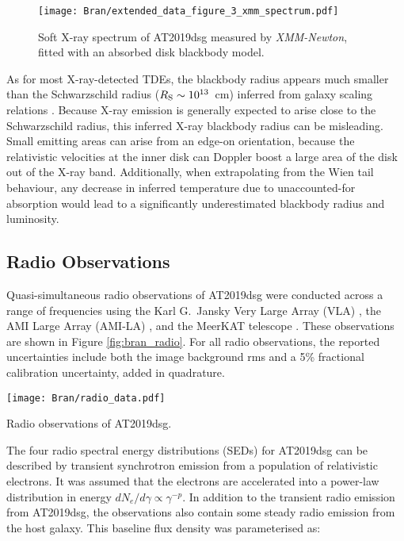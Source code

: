 \begin{figure}[!ht]
	\texttt{[image: Bran/extended\_data\_figure\_3\_xmm\_spectrum.pdf]}
	\caption{Soft X-ray spectrum of AT2019dsg measured by \textit{XMM-Newton}, fitted with an absorbed disk blackbody model.}
	\label{fig:xrayspec}
\end{figure}

As for most X-ray-detected TDEs, the blackbody radius appears much smaller than the Schwarzschild radius ($R_{\textup{S}} \sim 10^{13}$~cm) inferred from galaxy scaling relations .  Because X-ray emission is generally expected to arise close to the Schwarzschild radius, this inferred X-ray blackbody radius can be misleading. Small emitting areas can arise from an edge-on orientation, because the relativistic velocities at the inner disk can Doppler boost a large area of the disk out of the X-ray band.  Additionally, when extrapolating from the Wien tail behaviour, any decrease in inferred temperature due to unaccounted-for absorption would lead to a significantly underestimated blackbody radius and luminosity.

\subsection*{Radio Observations}

Quasi-simultaneous radio observations of AT2019dsg were conducted across a range of frequencies using the Karl G.\ Jansky Very Large Array (VLA) , the AMI Large Array (AMI-LA) , and the MeerKAT telescope . These observations are shown in Figure \ref{fig:bran_radio}.  For all radio observations, the reported uncertainties include both the image background rms and a 5\% fractional calibration uncertainty, added in quadrature.

\begin{marginfigure}
	\texttt{[image: Bran/radio\_data.pdf]}
	\caption{Radio observations of AT2019dsg.}
	\label{fig:bran_radio}
\end{marginfigure}

The four radio spectral energy distributions (SEDs) for AT2019dsg can be described by transient synchrotron emission from a population of relativistic electrons. It was assumed that the electrons are accelerated into a power-law distribution in energy $dN_{e}/d\gamma \propto \gamma^{-p}$. In addition to the transient radio emission from AT2019dsg, the observations also contain some steady radio emission from the host galaxy. This baseline flux density was parameterised as:

